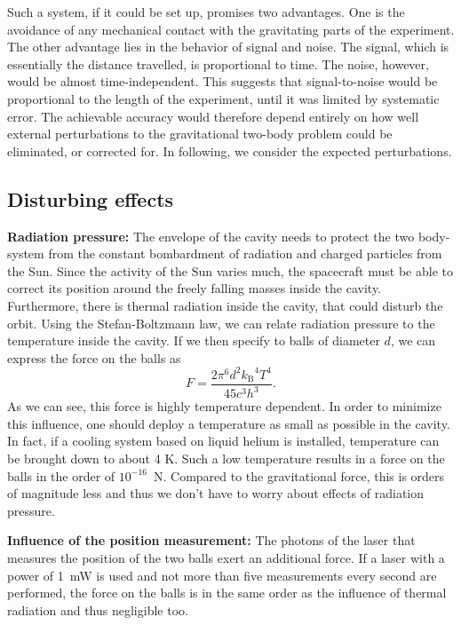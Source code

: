 \documentclass[prb,preprint]{revtex4-1}
\begin{document}
Such a system, if it could be set up, promises two advantages.  One is
the avoidance of any mechanical contact with the gravitating parts of
the experiment.  The other advantage lies in the behavior of signal
and noise.  The signal, which is essentially the distance travelled,
is proportional to time. The noise, however, would be almost
time-independent. This suggests that signal-to-noise would be
proportional to the length of the experiment, until it was limited by
systematic error. The achievable accuracy would therefore depend
entirely on how well external perturbations to the gravitational
two-body problem could be eliminated, or corrected for.  In following,
we consider the expected perturbations.

\subsection{Disturbing effects}

\textbf{Radiation pressure:} The envelope of the cavity needs to protect the two body-system from the constant bombardment of radiation and charged particles from the Sun. Since the activity of the Sun varies much, the spacecraft must be able to correct its position around the freely falling masses inside the cavity.\\
Furthermore, there is thermal radiation inside the cavity, that could disturb the orbit.
Using the Stefan-Boltzmann law, we can relate radiation pressure to the temperature inside the cavity. If we then specify to balls of diameter $d$, we can express the force on the balls as 
\begin{equation}
F = \frac{2 \pi^6 d^2 {k_\mathrm{B}}^4 T^4}{45 c^3 h^3}.
\end{equation}
As we can see, this force is highly temperature dependent. In order to minimize this influence, one should deploy a temperature as small as possible in the cavity. In fact, if a cooling system based on liquid helium is installed, temperature can be brought down to about 4 K. Such a low temperature results in a force on the balls in the order of $10^{-16}$~N. Compared to the gravitational force, this is orders of magnitude less and thus we don't have to worry about effects of radiation pressure.

\textbf{Influence of the position measurement:} 
The photons of the laser that measures the position of the two balls exert an additional force. If a laser with a power of 1~mW is used and not more than five measurements every second are performed, the force on the balls is in the same order as the influence of thermal radiation and thus negligible too.
\end{document}

